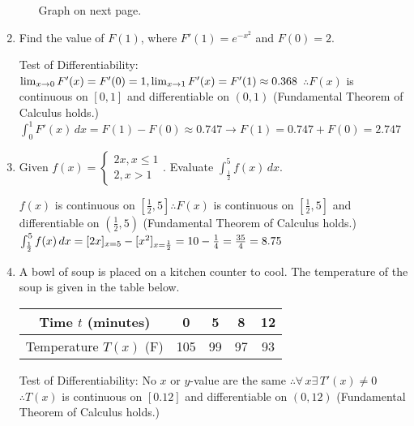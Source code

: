 \documentclass[10pt, letterpaper]{report}
\begin{document}
\begin{enumerate}
\begin{enumerate}
        Graph on next page. \\

		\end{enumerate}
	\item{Find the value of $F(1)$, where $F'(1)=e^{-x^{2}}$ and $F(0)=2$.\\}

    Test of Differentiability:
    $\lim_{x \to 0}F'(x)=F'(0)=1,
     \lim_{x \to 1}F'(x)=F'(1)\approx0.368\\$
     $\therefore F(x)$ is continuous on $[0,1]$ and differentiable on $(0,1)$ (Fundamental Theorem of Calculus holds.) \\


		$\int_{0}^{1}{F'(x)}\,dx=
      F(1)-F(0)\approx0.747\rightarrow
      F(1)=0.747+F(0)=2.747$

	\item{Given $f(x)=$$\begin{cases}
		2x, x\leq 1 \\
		2, x>1
		\end{cases}$. Evaluate $\int_{\frac{1}{2}}^{5}{f(x)}\,dx$.\\}

    $f(x)$ is continuous on $[\frac{1}{2},5] \therefore F(x)$ is continuous on $[\frac{1}{2},5]$ and differentiable on $(\frac{1}{2},5)$ (Fundamental Theorem of Calculus holds.) \\

		$\int_{\frac{1}{2}}^{5}{f(x)}\,dx=
    [2x]_{x=5}-[x^{2}]_{x=\frac{1}{2}}=
    10-\frac{1}{4}=\frac{35}{4}=8.75 \\$
\pagebreak
	\item{A bowl of soup is placed on a kitchen counter to cool. The temperature of the soup is given in the table below.
		\begin{center}
			\begin{tabular}{| c | c | c | c | c |}
				\hline
					Time $t$ (minutes) & 0 & 5 & 8 & 12 \\
				\hline
					Temperature $T(x)$ (\degree F) & 105 & 99 & 97 & 93 \\
				\hline
			\end{tabular}
		\end{center}}

    Test of Differentiability:
    No $x$ or $y$-value are the same $\therefore \forall\, x \exists\, T'(x) \neq0$ \\
    $\therefore T(x)$ is continuous on $[0.12]$ and differentiable on $(0,12)$ (Fundamental Theorem of Calculus holds.) \\


\end{enumerate}
\end{document}
